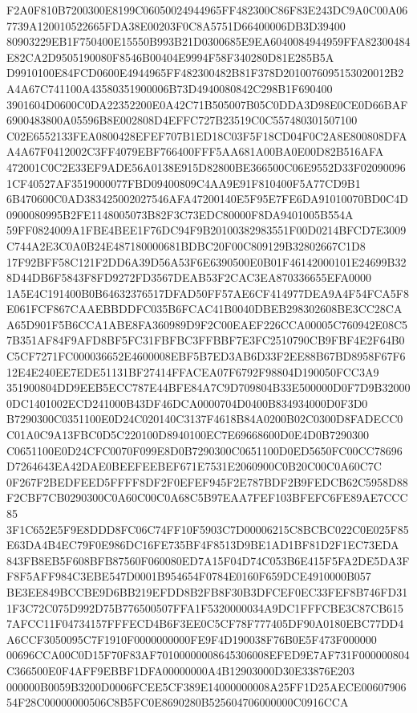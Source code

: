 \documentclass[UTF8,fontset=fandol,zihao=-4,a4paper]{ctexart}
\begin{document}
{{F2A0F810B7200300E8199C06050024944965FF482300C86F83E243DC9A0C00A067739A120010522665FDA38E00203F0C8A5751D66400006DB3D39400
80903229EB1F750400E15550B993B21D0300685E9EA6040084944959FFA82300484E82CA2D9505190080F8546B00404E9994F58F340280D81E285B5A
D9910100E84FCD0600E4944965FF482300482B81F378D2010076095153020012B2A4A67C741100A43580351900006B73D4940080842C298B1F690400
3901604D0600C0DA22352200E0A42C71B505007B05C0DDA3D98E0CE0D66BAF6900483800A05596B8E002808D4EFFC727B23519C0C557480301507100
C02E6552133FEA0800428EFEF707B1ED18C03F5F18CD04F0C2A8E800808DFAA4A67F0412002C3FF4079EBF766400FFF5AA681A00BA0E00D82B516AFA
472001C0C2E33EF9ADE56A0138E915D82800BE366500C06E9552D33F020900961CF40527AF3519000077FBD09400809C4AA9E91F810400F5A77CD9B1
6B470600C0AD383425002027546AFA47200140E5F95E7FE6DA91010070BD0C4D0900080995B2FE1148005073B82F3C73EDC80000F8DA9401005B554A
59FF0824009A1FBE4BEE1F76DC94F9B20100382983551F00D0214BFCD7E3009C744A2E3C0A0B24E487180000681BDBC20F00C809129B32802667C1D8
17F92BFF58C121F2DD6A39D56A53F6E6390500E0B01F46142000101E24699B328D44DB6F5843F8FD9272FD3567DEAB53F2CAC3EA870336655EFA0000
1A5E4C191400B0B64632376517DFAD50FF57AE6CF414977DEA9A4F54FCA5F8E061FCF867CAAEBBDDFC035B6FCAC41B0040DBEB298302608BE3CC28CA
A65D901F5B6CCA1ABE8FA360989D9F2C00EAEF226CCA00005C760942E08C57B351AF84F9AFD8BF5FC31FBFBC3FFBBF7E3FC2510790CB9FBF4E2F64B0
C5CF7271FC000036652E4600008EBF5B7ED3AB6D33F2EE88B67BD8958F67F612E4E240EE7EDE51131BF27414FFACEA07F6792F98804D190050FCC3A9
351900804DD9EEB5ECC787E44BFE84A7C9D709804B33E500000D0F7D9B320000DC1401002ECD241000B43DF46DCA0000704D0400B834934000D0F3D0
B7290300C0351100E0D24C020140C3137F4618B84A0200B02C0300D8FADECC0C01A0C9A13FBC0D5C220100D8940100EC7E69668600D0E4D0B7290300
C0651100E0D24CFC0070F099E8D0B7290300C0651100D0ED5650FC00CC78696D7264643EA42DAE0BEEFEEBEF671E7531E2060900C0B20C00C0A60C7C
0F267F2BEDFEED5FFFF8DF2F0EFEF945F2E787BDF2B9FEDCB62C5958D88F2CBF7CB0290300C0A60C00C0A68C5B97EAA7FEF103BFEFC6FE89AE7CCC85
3F1C652E5F9E8DDD8FC06C74FF10F5903C7D00006215C8BCBC022C0E025F85E63DA4B4EC79F0E986DC16FE735BF4F8513D9BE1AD1BF81D2F1EC73EDA
843FB8EB5F608BFB87560F060080ED7A15F04D74C053B6E415F5FA2DE5DA3FF8F5AFF984C3EBE547D0001B954654F0784E0160F659DCE4910000B057
BE3EE849BCCBE9D6BB219EFDD8B2FB8F30B3DFCEF0EC33FEF8B746FD311F3C72C075D992D75B776500507FFA1F5320000034A9DC1FFFCBE3C87CB615
7AFCC11F04734157FFFECD4B6F3EE0C5CF78F777405DF90A0180EBC77DD4A6CCF3050095C7F1910F0000000000FE9F4D190038F76B0E5F473F000000
00696CCA00C0D15F70F83AF70100000008645306008EFED9E7AF731F000000804C366500E0F4AFF9EBBF1DFA00000000A4B12903000D30E33876E203
000000B0059B3200D0006FCEE5CF389E14000000008A25FF1D25AECE0060790654F28C00000000506C8B5FC0E8690280B525604706000000C0916CCA
}}
\end{document}
